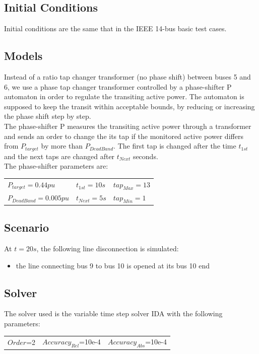 \documentclass[a4paper, 12pt]{report}
\begin{document}
\subsection{Initial Conditions}

Initial conditions are the same that in the IEEE 14-bus basic test cases.

\subsection{Models}

Instead of a ratio tap changer transformer (no phase shift) between buses 5 and 6, we use a phase tap changer transformer controlled by a phase-shifter P automaton in order to regulate the transiting active power.
The automaton is supposed to keep the transit within acceptable bounds, by reducing or increasing the phase shift step by step. \\

The phase-shifter P measures the transiting active power through a transformer and sends an order to change the its tap if the monitored active power differs from $P_{target}$ by more than $P_{DeadBand}$. The first tap is changed after the time $t_{1st}$ and the next taps are changed after $t_{Next}$ seconds.\\

The phase-shifter parameters are:
\begin{center}
\begin{tabular}{l|l|l}
   $P_{target}=0.44pu$ & $t_{1st}=10s$ & $tap_{Max}=13$ \\
   $P_{DeadBand}=0.005pu$  & $t_{Next}=5s$ & $tap_{Min}=1$ \\
\end{tabular}
\end{center}

\subsection{Scenario}
At $t=20s$, the following line disconnection is simulated:
\begin{itemize}
\item{the line connecting bus 9 to bus 10 is opened at its bus 10 end}
\end{itemize}

\subsection{Solver}
The solver used is the variable time step solver IDA with the following parameters:
\begin{center}
\begin{tabular}{l|l|l}
   $Order$=2 & $Accuracy_{Rel}$=10e-4 & $Accuracy_{Abs}$=10e-4 \\
\end{tabular}
\end{center}
\end{document}
